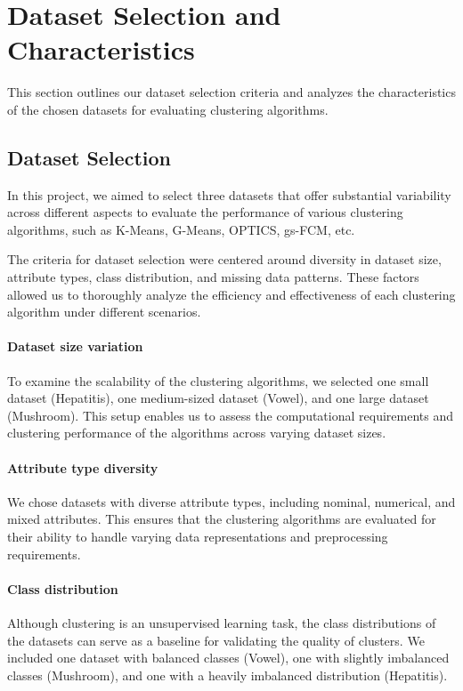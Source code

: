 \section{Dataset Selection and Characteristics}
\label{sec:dataset}

This section outlines our dataset selection criteria and analyzes the characteristics of the chosen datasets for evaluating clustering algorithms.

\subsection{Dataset Selection}
In this project, we aimed to select three datasets that offer substantial variability across different aspects to evaluate the performance of various clustering algorithms, such as K-Means, G-Means, OPTICS, gs-FCM, etc.

The criteria for dataset selection were centered around diversity in dataset size, attribute types, class distribution, and missing data patterns. These factors allowed us to thoroughly analyze the efficiency and effectiveness of each clustering algorithm under different scenarios.

\paragraph{Dataset size variation} 
To examine the scalability of the clustering algorithms, we selected one small dataset (Hepatitis), one medium-sized dataset (Vowel), and one large dataset (Mushroom). This setup enables us to assess the computational requirements and clustering performance of the algorithms across varying dataset sizes.

\paragraph{Attribute type diversity} 
We chose datasets with diverse attribute types, including nominal, numerical, and mixed attributes. This ensures that the clustering algorithms are evaluated for their ability to handle varying data representations and preprocessing requirements.

\paragraph{Class distribution} 
Although clustering is an unsupervised learning task, the class distributions of the datasets can serve as a baseline for validating the quality of clusters. We included one dataset with balanced classes (Vowel), one with slightly imbalanced classes (Mushroom), and one with a heavily imbalanced distribution (Hepatitis).

